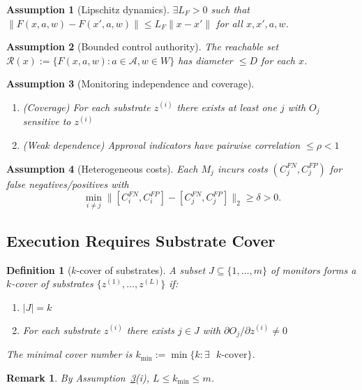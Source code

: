 \documentclass[11pt,a4paper]{article}
\newtheorem{definition}{Definition}
\newtheorem{assumption}{Assumption}
\newtheorem{remark}{Remark}
\begin{document}
\begin{assumption}[Lipschitz dynamics]
\label{ass:lipschitz}
$\exists L_F > 0$ such that $\|F(x,a,w) - F(x',a,w)\| \leq L_F \|x-x'\|$ for all $x,x',a,w$.
\end{assumption}

\begin{assumption}[Bounded control authority]
\label{ass:control}
The reachable set $\mathcal{R}(x) := \{F(x,a,w): a \in \mathcal{A}, w \in W\}$ has diameter $\leq D$ for each $x$.
\end{assumption}

\begin{assumption}[Monitoring independence and coverage]
\label{ass:independence}
\begin{enumerate}
\item (Coverage) For each substrate $z^{(i)}$ there exists at least one $j$ with $O_j$ sensitive to $z^{(i)}$
\item (Weak dependence) Approval indicators have pairwise correlation $\leq \rho < 1$
\end{enumerate}
\end{assumption}

\begin{assumption}[Heterogeneous costs]
\label{ass:heterogeneity}
Each $M_j$ incurs costs $(C_j^{FN}, C_j^{FP})$ for false negatives/positives with
$$\min_{i \neq j} \|[C_i^{FN}, C_i^{FP}] - [C_j^{FN}, C_j^{FP}]\|_2 \geq \delta > 0.$$
\end{assumption}

\subsection{Execution Requires Substrate Cover}

\begin{definition}[$k$-cover of substrates]
\label{def:cover}
A subset $J \subseteq \{1,\ldots,m\}$ of monitors forms a $k$-cover of substrates $\{z^{(1)},\ldots,z^{(L)}\}$ if:
\begin{enumerate}
\item $|J| = k$
\item For each substrate $z^{(i)}$ there exists $j \in J$ with $\partial O_j/\partial z^{(i)} \neq 0$
\end{enumerate}
The minimal cover number is $k_{\min} := \min\{k: \exists \text{ $k$-cover}\}$.
\end{definition}

\begin{remark}
By Assumption~\ref{ass:independence}(i), $L \leq k_{\min} \leq m$.
\end{remark}
\end{document}

